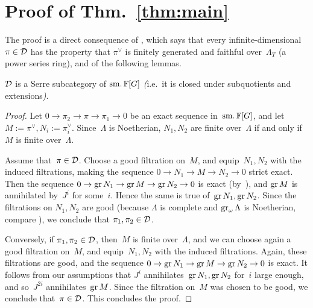 \documentclass[oneside,a4paper,english, 11pt]{amsart}
\begin{document}
\section{Proof of Thm.\ \ref{thm:main}}

The proof is a direct consequence of
\cite[Thm. 1.1]{Zhao}, which says that every infinite-dimensional $\pi \in \mathcal{D}$ has the property that $\pi^\vee$ is finitely generated and faithful over~$\Lambda_T$
(a power series ring), and of the following lemmas.



    
\begin{lemma}\label{lem:Serre subcategory}
    $\mathcal{D}$ is a Serre subcategory of $\operatorname{sm.} \mathbb{F}[G]$ {\em (}i.e.\ it is closed under subquotients and extensions{\em )}.
\end{lemma}
\begin{proof}
    Let $0 \to \pi_2 \to \pi \to \pi_1 \to 0$ be an exact sequence in~$\operatorname{sm.} \mathbb{F}[G]$, and let $M := \pi^\vee, N_i := \pi_i^\vee$.
    Since~$\Lambda$ is Noetherian, 
    $N_1, N_2$ are finite over~$\Lambda$ if and only if $M$ is finite over~$\Lambda$.

    Assume that~$\pi \in \mathcal{D}$.
    Choose a good filtration on~$M$, and equip~$N_1, N_2$ with the induced filtrations, making the sequence 
    $0 \to N_1 \to M \to N_2 \to 0$ strict exact.
    Then the sequence
    $0 \to \operatorname{gr} N_1 \to \operatorname{gr} M \to \operatorname{gr} N_2 \to 0$ is exact (by~\cite[Thm.\ I.4.2.4]{HvO}),
    and
    $\operatorname{gr} M$ is annihilated by~$J^i$ for some~$i$. 
    Hence the same is true of~$\operatorname{gr} N_1, \operatorname{gr} N_2$.
    Since the filtrations on $N_1, N_2$ are good (because $\Lambda$ is complete and $\operatorname{gr}_\omega \Lambda$ is Noetherian, compare \cite[Thm.\ I.5.7]{HvO}), 
    we conclude that $\pi_1, \pi_2 \in \mathcal{D}$.

    Conversely, if $\pi_1, \pi_2 \in \mathcal{D}$, then~$M$ is finite over~$\Lambda$, and we can
    choose again a good filtration on~$M$, and equip~$N_1, N_2$ with the induced filtrations. 
    Again, these filtrations are good, and the sequence
    $0 \to \operatorname{gr} N_1 \to \operatorname{gr} M \to \operatorname{gr} N_2 \to 0$ is exact.
    It follows from our assumptions that $J^i$ annihilates~$\operatorname{gr} N_1, \operatorname{gr} N_2$ for~$i$ large enough,
    and so~$J^{2i}$ annihilates~$\operatorname{gr} M$. 
    Since the filtration on~$M$ was chosen to be good, we conclude that~$\pi \in \mathcal{D}$.
    This concludes the proof.
\end{proof}
\end{document}
